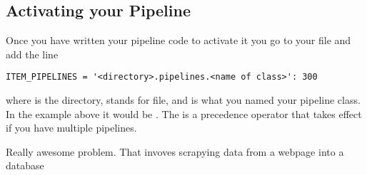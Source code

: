 \subsection*{Activating your Pipeline}
Once you have written your pipeline code to activate it you go to your  file and add the line
\begin{lstlisting}
ITEM_PIPELINES = '<directory>.pipelines.<name of class>': 300
\end{lstlisting}
where  is the directory,  stands for  file, and  is what you named your pipeline class. In the example above it would be . The  is a precedence operator that takes effect if you have multiple pipelines.

\begin{problem}
Really awesome problem. That invoves scrapying data from a webpage into a database 
\end{problem}